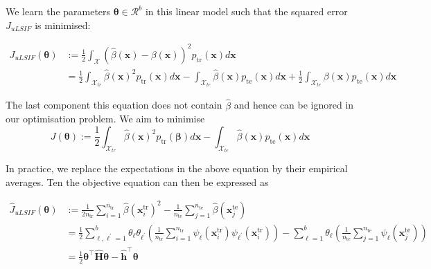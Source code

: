 \documentclass[a4paper,12pt]{article}
\begin{document}
We learn the parameters $\boldsymbol{\theta} \in \mathcal{R}^{b}$ in this linear model such that the squared error $J_{uLSIF}$ is minimised:

\begin{align*}
J_{uLSIF}(\boldsymbol{\theta}) &:=\frac{1}{2} \int_{\mathcal{X}}(\widehat{\beta}(\boldsymbol{x})-\beta(\boldsymbol{x}))^{2} p_{\mathrm{tr}}(\boldsymbol{x}) d \boldsymbol{x} \\
&=\frac{1}{2} \int_{\mathcal{X}_{tr}} \widehat{\beta}(\boldsymbol{x})^{2} p_{\mathrm{tr}}(\boldsymbol{x}) d \boldsymbol{x}-\int_{\mathcal{X}_{te}} \widehat{\beta}(\boldsymbol{x}) p_{\mathrm{te}}(\boldsymbol{x}) d \boldsymbol{x}+\frac{1}{2} \int_{\mathcal{X}_{te}} \beta(\boldsymbol{x}) p_{\mathrm{te}}(\boldsymbol{x}) d \boldsymbol{x}
\end{align*}

The last component this equation does not contain $\widehat{\beta}$ and hence can be ignored in our optimisation problem. We aim to minimise
\begin{equation*}
J(\boldsymbol{\theta}):=\frac{1}{2} \int_{\mathcal{X}_{tr}} \widehat{\beta}(\boldsymbol{x})^{2} p_{\mathrm{tr}}(\boldsymbol{\beta}) d \boldsymbol{x}-\int_{\mathcal{X}_{te}} \widehat{\beta}(\boldsymbol{x}) p_{\mathrm{te}}(\boldsymbol{x}) d \boldsymbol{x}
\end{equation*}

In practice, we replace the expectations in the above equation by their empirical averages. Ten the objective equation can then be expressed as

\begin{align*}
\widehat{J}_{uLSIF}(\boldsymbol{\theta}) &:=\frac{1}{2 n_{\mathrm{tr}}} \sum_{i=1}^{n_{\mathrm{tr}}} \widehat{\beta}\left({\boldsymbol{x}}_{i}^{\mathrm{tr}}\right)^{2}-\frac{1}{n_{\mathrm{te}}} \sum_{j=1}^{n_{\mathrm{te}}} \widehat{\beta}\left({\boldsymbol{x}}_{j}^{\mathrm{te}}\right) \\
&=\frac{1}{2} \sum_{\ell, \ell^{\prime}=1}^{b} \theta_{\ell} \theta_{\ell^{\prime}}\left(\frac{1}{n_{\mathrm{tr}}} \sum_{i=1}^{n_{\mathrm{tr}}} \psi_{\ell}\left({\boldsymbol{x}}_{i}^{\mathrm{tr}}\right) \psi_{\ell^{\prime}}\left({\boldsymbol{x}}_{i}^{\mathrm{tr}}\right)\right)-\sum_{\ell=1}^{b} \theta_{\ell}\left(\frac{1}{n_{\mathrm{te}}} \sum_{j=1}^{n_{\mathrm{te}}} \psi_{\ell}\left({\boldsymbol{x}}_{j}^{\mathrm{te}}\right)\right) \\
&=\frac{1}{2} \boldsymbol{\theta}^{\top} \widehat{\boldsymbol{H}} \boldsymbol{\theta}-\widehat{\boldsymbol{h}}^{\top} \boldsymbol{\theta}
\end{align*}
 
\end{document}

